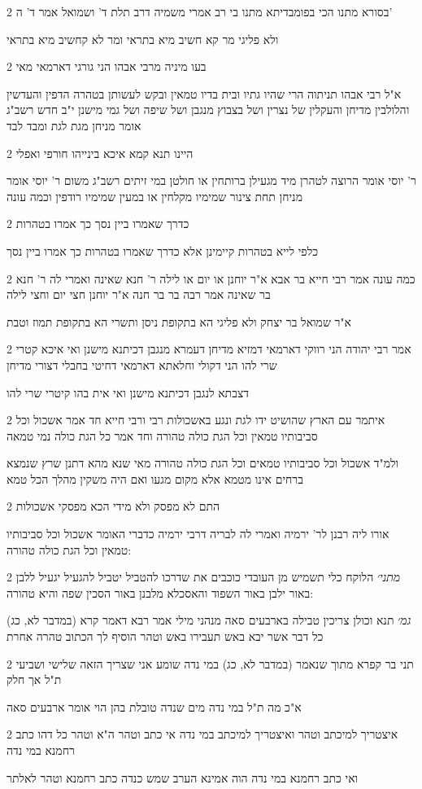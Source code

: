 \documentclass[12pt, openany]{book}
\newcommand{\sethebfont}{
\fontsize{10.5pt}{21.0pt} \selectfont
}
\newcommand{\twocol}[1]{
	{\sethebfont \begin{multicols}{2}
			#1
	\end{multicols}}	
}
\begin{document}
\twocol{בסורא מתנו הכי בפומבדיתא מתנו בי רב אמרי משמיה דרב תלת ד' ושמואל אמר ד' ה'
\par ולא פליגי מר קא חשיב מיא בתראי ומר לא קחשיב מיא בתראי}
\twocol{בעו מיניה מרבי אבהו הני גורגי דארמאי מאי
\par א"ל רבי אבהו תניתוה הרי שהיו גתיו ובית בדיו טמאין ובקש לעשותן בטהרה הדפין והעדשין והלולבין מדיחן והעקלין של נצרין ושל בצבוץ מנגבן ושל שיפה ושל גמי מישנן י"ב חדש רשב"ג אומר מניחן מגת לגת ומבד לבד}
\twocol{היינו תנא קמא איכא בינייהו חורפי ואפלי
\par ר' יוסי אומר הרוצה לטהרן מיד מגעילן ברותחין או חולטן במי זיתים רשב"ג משום ר' יוסי אומר מניחן תחת צינור שמימיו מקלחין או במעין שמימיו רודפין וכמה עונה}
\twocol{כדרך שאמרו ביין נסך כך אמרו בטהרות
\par כלפי לייא בטהרות קיימינן אלא כדרך שאמרו בטהרות כך אמרו ביין נסך}
\twocol{כמה עונה אמר רבי חייא בר אבא א"ר יוחנן או יום או לילה ר' חנא שאינה ואמרי לה ר' חנא בר שאינה אמר רבה בר בר חנה א"ר יוחנן חצי יום וחצי לילה
\par א"ר שמואל בר יצחק ולא פליגי הא בתקופת ניסן ותשרי הא בתקופת תמוז וטבת}
\twocol{אמר רבי יהודה הני רווקי דארמאי דמזיא מדיחן דעמרא מנגבן דכיתנא מישנן ואי איכא קטרי שרי להו הני דקולי וחלאתא דארמאי דחיטי בחבלי דצורי מדיחן
\par דצבתא לנגבן דכיתנא מישנן ואי אית בהו קיטרי שרי להו}
\twocol{איתמר עם הארץ שהושיט ידו לגת ונגע באשכולות רבי ורבי חייא חד אמר אשכול וכל סביבותיו טמאין וכל הגת כולה טהורה וחד אמר כל הגת כולה נמי טמאה
\par ולמ"ד אשכול וכל סביבותיו טמאים וכל הגת כולה טהורה מאי שנא מהא דתנן שרץ שנמצא ברחים אינו מטמא אלא מקום מגעו ואם היה משקין מהלך הכל טמא}
\twocol{התם לא מפסק ולא מידי הכא מפסקי אשכולות
\par אורו ליה רבנן לר' ירמיה ואמרי לה לבריה דרבי ירמיה כדברי האומר אשכול וכל סביבותיו טמאין וכל הגת כולה טהורה:}
\twocol{{\large\emph{מתני׳}} הלוקח כלי תשמיש מן העובדי כוכבים את שדרכו להטביל יטביל להגעיל יגעיל ללבן באור ילבן באור השפוד והאסכלא מלבנן באור הסכין שפה והיא טהורה:
\par {\large\emph{גמ׳}} תנא וכולן צריכין טבילה בארבעים סאה מנהני מילי אמר רבא דאמר קרא (במדבר לא, כג) כל דבר אשר יבא באש תעבירו באש וטהר הוסיף לך הכתוב טהרה אחרת}
\twocol{תני בר קפרא מתוך שנאמר (במדבר לא, כג) במי נדה שומע אני שצריך הזאה שלישי ושביעי ת"ל אך חלק
\par א"כ מה ת"ל במי נדה מים שנדה טובלת בהן הוי אומר ארבעים סאה}
\twocol{איצטריך למיכתב וטהר ואיצטריך למיכתב במי נדה אי כתב וטהר ה"א וטהר כל דהו כתב רחמנא במי נדה
\par ואי כתב רחמנא במי נדה הוה אמינא הערב שמש כנדה כתב רחמנא וטהר לאלתר}
\end{document}
